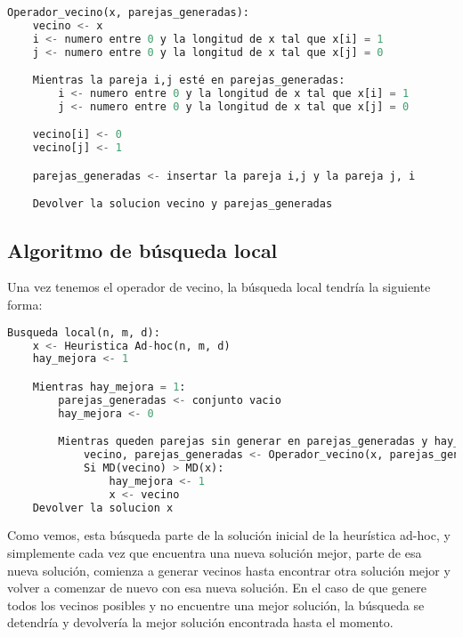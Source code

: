 \begin{lstlisting}[language=python]
Operador_vecino(x, parejas_generadas):
	vecino <- x
	i <- numero entre 0 y la longitud de x tal que x[i] = 1
	j <- numero entre 0 y la longitud de x tal que x[j] = 0

	Mientras la pareja i,j esté en parejas_generadas:
		i <- numero entre 0 y la longitud de x tal que x[i] = 1
		j <- numero entre 0 y la longitud de x tal que x[j] = 0

	vecino[i] <- 0
	vecino[j] <- 1

	parejas_generadas <- insertar la pareja i,j y la pareja j, i

	Devolver la solucion vecino y parejas_generadas
\end{lstlisting}

\newpage

\subsection{Algoritmo de búsqueda local}


Una vez tenemos el operador de vecino, la búsqueda local tendría la siguiente forma:

\begin{lstlisting}[language=python]
Busqueda local(n, m, d):
	x <- Heuristica Ad-hoc(n, m, d)
	hay_mejora <- 1

	Mientras hay_mejora = 1:
		parejas_generadas <- conjunto vacio
		hay_mejora <- 0

		Mientras queden parejas sin generar en parejas_generadas y hay_mejora = 0:
			vecino, parejas_generadas <- Operador_vecino(x, parejas_generadas)
			Si MD(vecino) > MD(x):
				hay_mejora <- 1
				x <- vecino
	Devolver la solucion x
\end{lstlisting}

Como vemos, esta búsqueda parte de la solución inicial de la heurística ad-hoc, y simplemente cada vez que encuentra una nueva solución mejor, parte de esa nueva solución, comienza a generar vecinos hasta encontrar otra solución mejor y volver a comenzar de nuevo con esa nueva solución. En el caso de que genere todos los vecinos posibles y no encuentre una mejor solución, la búsqueda se detendría y devolvería la mejor solución encontrada hasta el momento.
